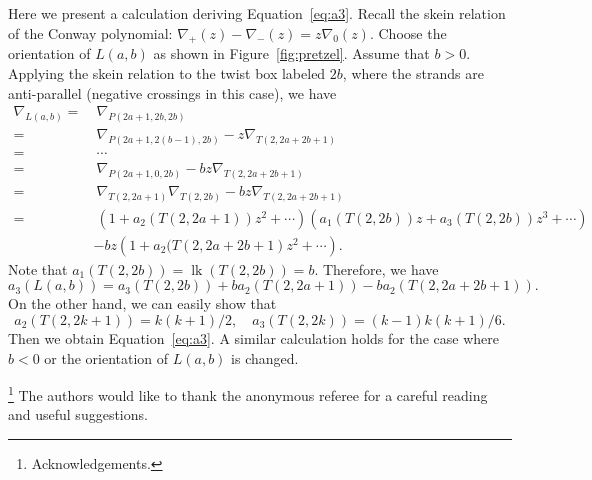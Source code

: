 \documentclass{amsart}
\theoremstyle{remark}
\newcommand{\lk}{\mathop{\mathrm{lk}}\nolimits}
\begin{document}
Here we present a calculation deriving Equation~\eqref{eq:a3}. 
Recall the skein relation of the Conway polynomial: $\nabla_{+}(z) - \nabla_{-}(z) = z \nabla_{0}(z)$. 
Choose the orientation of $L(a,b)$ as shown in Figure~\ref{fig:pretzel}. 
Assume that $b >0$. 
Applying the skein relation to the twist box labeled $2b$, where the strands are anti-parallel (negative crossings in this case), we have 
\begin{align*}
    \nabla_{L(a,b)} =& \ \nabla_{P(2a+1,2b,2b)} \\ 
    =& \ \nabla_{P(2a+1,2(b-1),2b)} - z \nabla_{T(2,2a+2b+1)} \\ 
    =& \ \cdots \\ 
    =& \ \nabla_{P(2a+1,0,2b)} - b z \nabla_{T(2,2a+2b+1)} \\ 
    =& \ \nabla_{T(2,2a+1)} \nabla_{T(2,2b)} - b z \nabla_{T(2,2a+2b+1)} \\ 
    =& \ \left(1 + a_2(T(2,2a+1)) z^2 + \cdots \right) \left(a_1(T(2,2b)) z + a_3(T(2,2b)) z^3 + \cdots \right) \\ 
    &- b z \left(1 + a_2(T(2,2a+2b+1) z^2 + \cdots\right).  
\end{align*}
Note that $a_1(T(2,2b)) = \lk \left( T(2,2b) \right) = b$. 
Therefore, we have 
\[ a_3 (L(a,b) ) = a_3(T(2,2b))+ b a_2( T(2,2a+1) ) - b a_2( T(2,2a+2b+1) ). \]
On the other hand, we can easily show that 
\[ a_2(T(2,2k+1) ) = k(k+1)/2, \quad a_3(T(2,2k)) = (k-1)k(k+1)/6. \]
Then we obtain Equation~\eqref{eq:a3}. 
A similar calculation holds for the case where $b < 0$ or the orientation of $L(a,b)$ is changed. 



\bigskip 
\thanks{Acknowledgements.} 
The authors would like to thank the anonymous referee for a careful reading and useful suggestions. 
\end{document}

